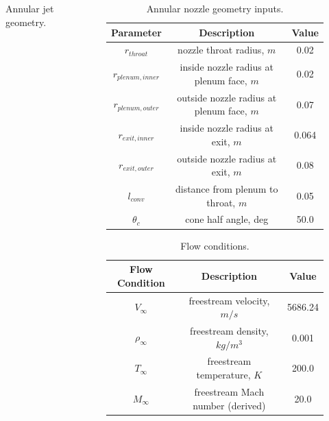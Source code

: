 \documentclass{beamer}
\begin{document}
\begin{frame}
\begin{columns}
\begin{column}{0.4\textwidth}
\begin{figure}
      \caption{Annular jet geometry.}
    \end{figure}
    \end{column}
    \begin{column}{0.65\textwidth}
      \tiny
    \begin{table}[h]
      \centering
      \begin{tabular}{c|c|c}
        Parameter & Description & Value \\
        \hline
        $r_{throat}$       &   nozzle throat radius, $m$                 & 0.02 \\
        $r_{plenum,inner}$ &   inside nozzle radius at plenum face, $m$  & 0.02 \\
        $r_{plenum,outer}$ &   outside nozzle radius at plenum face, $m$ & 0.07 \\
        $r_{exit,inner}$   &   inside nozzle radius at exit, $m$         & 0.064 \\
        $r_{exit,outer}$   &   outside nozzle radius at exit, $m$        & 0.08 \\
        $l_{conv}$         &   distance from plenum to throat, $m$       & 0.05 \\
        $\theta_c$         &   cone half angle, deg                      & 50.0
      \end{tabular}
      \caption{Annular nozzle geometry inputs.}
      \label{tab:annular-geom}
    \end{table}
    \begin{table}[!h]
      \centering
      \begin{tabular}{c|c|c}
        Flow Condition & Description & Value \\
        \hline
        $V_{\infty}$    & freestream velocity, $m/s$        & 5686.24 \\
        $\rho_{\infty}$ & freestream density, $kg/m^3$      & 0.001 \\
        $T_{\infty}$    & freestream temperature, $K$       & 200.0 \\
        $M_{\infty}$    & freestream Mach number (derived)  & 20.0
      \end{tabular}
      \caption{Flow conditions.}
      \label{tab:flow-conditions-backup}
    \end{table}
    \end{column}
  \end{columns}
\end{frame}
\end{document}
